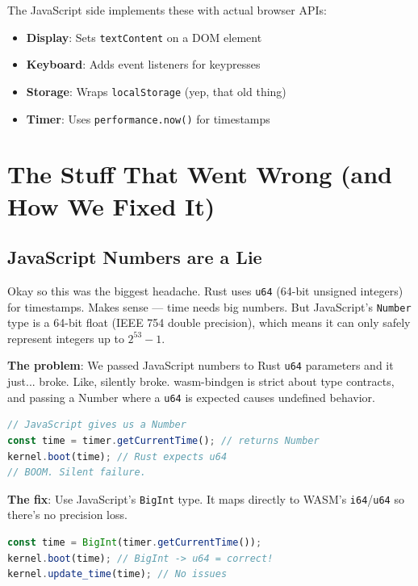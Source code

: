 \documentclass[conference]{IEEEtran}
\begin{document}
The JavaScript side implements these with actual browser APIs:
\begin{itemize}
    \item \textbf{Display}: Sets \texttt{textContent} on a DOM element
    \item \textbf{Keyboard}: Adds event listeners for keypresses
    \item \textbf{Storage}: Wraps \texttt{localStorage} (yep, that old thing)
    \item \textbf{Timer}: Uses \texttt{performance.now()} for timestamps
\end{itemize}

\section{The Stuff That Went Wrong (and How We Fixed It)}

\subsection{JavaScript Numbers are a Lie}

Okay so this was the biggest headache. Rust uses \texttt{u64} (64-bit unsigned integers) for timestamps. Makes sense — time needs big numbers. But JavaScript's \texttt{Number} type is a 64-bit float (IEEE 754 double precision), which means it can only safely represent integers up to $2^{53}-1$.

\textbf{The problem}: We passed JavaScript numbers to Rust \texttt{u64} parameters and it just... broke. Like, silently broke. wasm-bindgen is strict about type contracts, and passing a Number where a \texttt{u64} is expected causes undefined behavior.

\begin{lstlisting}[language=JavaScript, caption=This Breaks Everything]
// JavaScript gives us a Number
const time = timer.getCurrentTime(); // returns Number
kernel.boot(time); // Rust expects u64
// BOOM. Silent failure.
\end{lstlisting}

\textbf{The fix}: Use JavaScript's \texttt{BigInt} type. It maps directly to WASM's \texttt{i64}/\texttt{u64} so there's no precision loss.

\begin{lstlisting}[language=JavaScript, caption=This Actually Works]
const time = BigInt(timer.getCurrentTime());
kernel.boot(time); // BigInt -> u64 = correct!
kernel.update_time(time); // No issues
\end{lstlisting}
\end{document}
